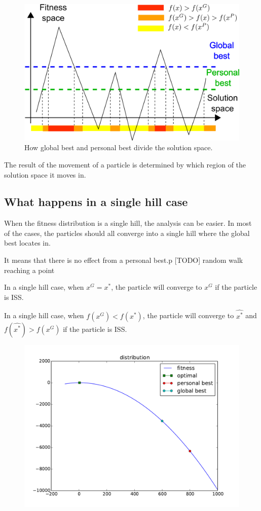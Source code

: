 \begin{figure}
\centering
\includegraphics[width=0.7\linewidth]{./fig/categorize_regions}
\caption{How global best and personal best divide the solution space.}
\label{fig:categorize_regions}
\end{figure}

The result of the movement of a particle is determined by which region of the solution space it moves in.

\subsection{What happens in a single hill case}

When the fitness distribution is a single hill, the analysis can be easier.
In most of the cases, the particles should all converge into a single hill where the global best locates in.



It means that there is no effect from a personal best.p
[TODO] random walk reaching a point


\begin{mylem}
In a single hill case, when $ x^{G} = x^{*} $, the particle will converge to $ x^{G} $ if the particle is ISS.
\end{mylem}

\begin{mylem}
In a single hill case, when $ f( x^{G} ) < f( x^{*}) $, the particle will converge to $ \hat{x^{*}} $ and $ f(\hat{x^{*}}) > f(x^{G}) $ if the particle is ISS.
\end{mylem}

\begin{figure}[ht]
\centering
\includegraphics[width=.7\linewidth]{./simfig/case1/distribution1}
\label{fig:case1-1:distribution} 
\end{figure}

